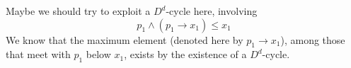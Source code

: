 \vfill

Maybe we should try to exploit a $D^d$-cycle here, involving
\[p_1 \wedge (p_1 \to x_1) \leq x_1\]
We know that the maximum element (denoted here by $p_1 \to x_1$), 
among those that meet with $p_1$ below $x_1$, exists by the existence of a 
$D^d$-cycle. 


% 
% 
% 





\newpage



  \appendix


